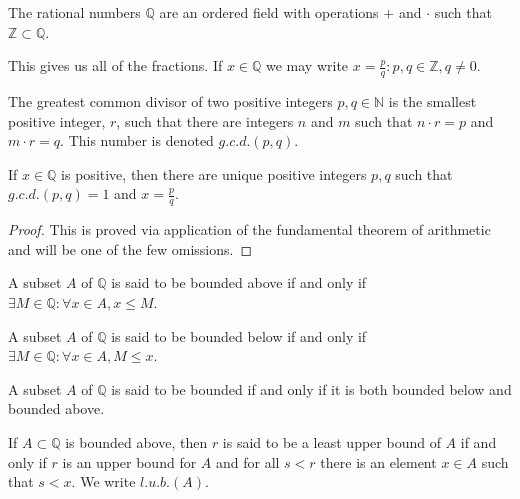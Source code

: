 \documentclass[crop=false,class=book,oneside]{standalone}
\begin{document}
            \begin{definition}
            The rational numbers $\mathbb{Q}$ are an ordered field with operations $+$ and $\cdot$ such that $\mathbb{Z}\subset \mathbb{Q}$.
            \end{definition}
            \begin{remark}
            This gives us all of the fractions. If $x\in \mathbb{Q}$ we may write $x= \frac{p}{q}:p,q\in \mathbb{Z}, q\ne 0$.
            \end{remark}
            \begin{definition}
            The greatest common divisor of two positive integers $p,q\in \mathbb{N}$ is the smallest positive integer, $r$, such that there are integers $n$ and $m$ such that $n\cdot r = p$ and $m\cdot r = q$. This number is denoted $g.c.d.(p,q)$.
            \end{definition}
            \begin{theorem}
            If $x\in \mathbb{Q}$ is positive, then there are unique positive integers $p, q$ such that $g.c.d.(p,q)=1$ and $x=\frac{p}{q}$.
            \end{theorem}
            \begin{proof}
            This is proved via application of the fundamental theorem of arithmetic and will be one of the few omissions.
            \end{proof}
            \begin{definition}
            A subset $A$ of $\mathbb{Q}$ is said to be bounded above if and only if $\exists M\in \mathbb{Q}: \forall x\in A,x \leq M$.
            \end{definition}
            \begin{definition}
            A subset $A$ of $\mathbb{Q}$ is said to be bounded below if and only if $\exists M\in \mathbb{Q}:\forall x\in A,M\leq x$. 
            \end{definition}
            \begin{definition}
            A subset $A$ of $\mathbb{Q}$ is said to be bounded if and only if it is both bounded below and bounded above.
            \end{definition}
            \begin{definition}
            If $A\subset \mathbb{Q}$ is bounded above, then $r$ is said to be a least upper bound of $A$ if and only if $r$ is an upper bound for $A$ and for all $s<r$ there is an element $x\in A$ such that $s<x$. We write $l.u.b.(A)$.
            \end{definition}
\end{document}
